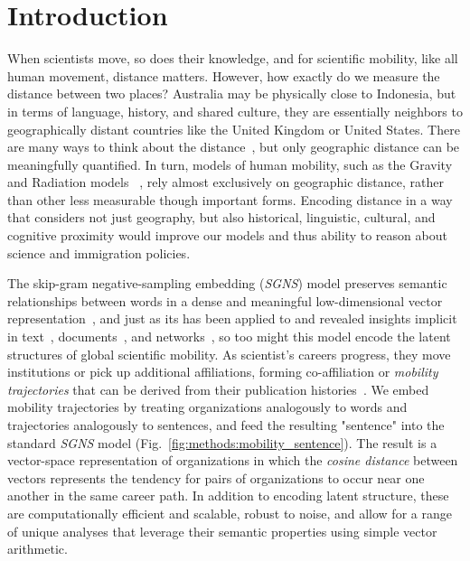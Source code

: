 \documentclass[12pt]{article} %
\def\SGNS{\textit{SGNS}}
\begin{document}
%
%
\section{Introduction}\label{sec:introduction} %


When scientists move, so does their knowledge, and for scientific mobility, like all human movement, distance matters. 
However, how exactly do we measure the distance between two places?
Australia may be physically close to Indonesia, but in terms of language, history, and shared culture, they are essentially neighbors to geographically distant countries like the United Kingdom or United States. 
There are many ways to think about the distance~\autocite{boschma2005proximity}, but only geographic distance can be meaningfully quantified. 
In turn, models of human mobility, such as the Gravity~\autocite{zipf1946gravity} and Radiation models ~\autocite{simini2012universal}, rely almost exclusively on geographic distance, rather than other less measurable though important forms. 
Encoding distance in a way that considers not just geography, but also historical, linguistic, cultural, and cognitive proximity would improve our models and thus ability to reason about science and immigration policies. 

The skip-gram negative-sampling embedding (\SGNS) model preserves semantic relationships between words in a dense and meaningful low-dimensional vector representation~\autocite{mikolov2013word2vec}, and just as its has been applied to and revealed insights implicit in text~\autocite{linzhuo2020hyperbolic, tshitoyan2019mat2vec, garg2018gender, kozlowski2018geometry, hamilton2016diachronic}, documents~\autocite{le2014doc2vec, nakandala2016twitch}, and networks~\autocite{perozzi2014deepwalk, grover2016node2vec}, so too might this model encode the latent structures of global scientific mobility. 
As scientist's careers progress, they move institutions or pick up additional affiliations, forming co-affiliation or \textit{mobility trajectories} that can be derived from their publication histories~\autocite{robinson2019mobility, sugimoto2017mostimpact}. 
We embed mobility trajectories by treating organizations analogously to words and trajectories analogously to sentences, and feed the resulting "sentence" into the standard \SGNS{} model (Fig.~\ref{fig:methods:mobility_sentence}).
The result is a vector-space representation of organizations in which the \textit{cosine distance} between vectors represents the tendency for pairs of organizations to occur near one another in the same career path. 
In addition to encoding latent structure, these  are computationally efficient and scalable, robust to noise, and allow for a range of unique analyses that leverage their semantic properties using simple vector arithmetic. 
\end{document}
